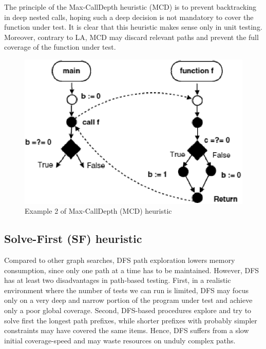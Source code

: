The principle of the Max-CallDepth heuristic (MCD) is to prevent backtracking in deep nested calls, hoping such a deep decision is not mandatory to cover the function under test. It is clear that this heuristic makes sense only in unit testing. Moreover, contrary to LA, MCD may discard relevant paths and prevent the full coverage of the function under test. 

\begin{figure}[b]
\centering
\includegraphics[scale=0.6,clip]{fig/mcd2.eps} 
\caption{\label{fig:mcd2}Example 2 of Max-CallDepth (MCD) heuristic} 
\end{figure}

\subsection{Solve-First (SF) heuristic}
Compared to other graph searches, DFS path exploration lowers memory consumption, since only one path at a time has to be maintained. However, DFS has at least two disadvantages in path-based testing. First, in a realistic environment where the number of tests we can run is limited, DFS may focus only on a very deep and narrow portion of the program under test and achieve only a poor global coverage. Second, DFS-based procedures explore and try to solve first the longest path prefixes, while shorter prefixes with probably simpler constraints may have covered the same items. Hence, DFS suffers from a slow initial coverage-speed and may waste resources on unduly complex paths.

